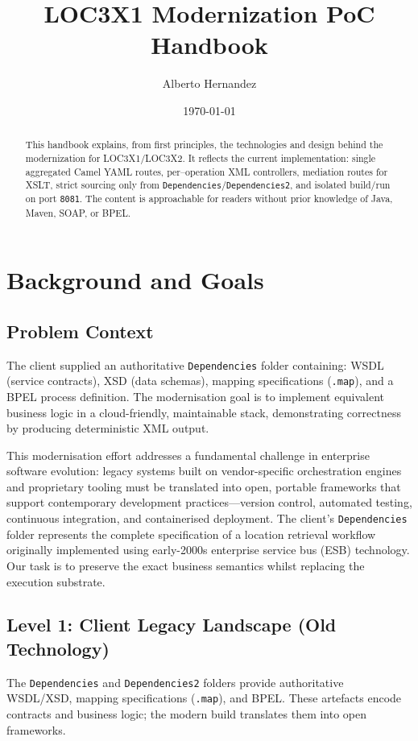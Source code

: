 \documentclass[11pt]{article}
\title{LOC3X1 Modernization PoC Handbook}
\author{Alberto Hernandez}
\date{\today}
\begin{document}
\maketitle
\begin{abstract}
This handbook explains, from first principles, the technologies and design behind the modernization for LOC3X1/LOC3X2. It reflects the current implementation: single aggregated Camel YAML routes, per–operation XML controllers, mediation routes for XSLT, strict sourcing only from \texttt{Dependencies}/\texttt{Dependencies2}, and isolated build/run on port \texttt{8081}. The content is approachable for readers without prior knowledge of Java, Maven, SOAP, or BPEL.
\end{abstract}

\tableofcontents

\section{Background and Goals}
\subsection{Problem Context}
The client supplied an authoritative \texttt{Dependencies} folder containing: WSDL (service contracts), XSD (data schemas), mapping specifications (\texttt{.map}), and a BPEL process definition. The modernisation goal is to implement equivalent business logic in a cloud-friendly, maintainable stack, demonstrating correctness by producing deterministic XML output. 

This modernisation effort addresses a fundamental challenge in enterprise software evolution: legacy systems built on vendor-specific orchestration engines and proprietary tooling must be translated into open, portable frameworks that support contemporary development practices—version control, automated testing, continuous integration, and containerised deployment. The client's \texttt{Dependencies} folder represents the complete specification of a location retrieval workflow originally implemented using early-2000s enterprise service bus (ESB) technology. Our task is to preserve the exact business semantics whilst replacing the execution substrate.

\subsection{Level 1: Client Legacy Landscape (Old Technology)}\label{subsec:client-legacy-landscape}
The \texttt{Dependencies} and \texttt{Dependencies2} folders provide authoritative WSDL/XSD, mapping specifications (\texttt{.map}), and BPEL. These artefacts encode contracts and business logic; the modern build translates them into open frameworks.
\end{document}
